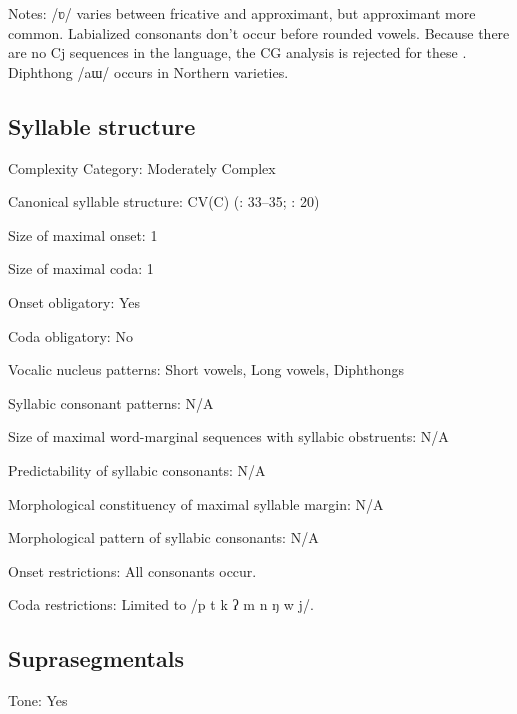 {\begin{appendixdesc}
\item[Notes:] /ʋ/ varies between fricative and approximant, but approximant more common. Labialized consonants don’t occur before rounded vowels. Because there are no Cj sequences in the language, the CG analysis is rejected for these \citep[138]{Erickson2001}. Diphthong /aɯ/ occurs in Northern varieties.
\end{appendixdesc}
\subsection*{Syllable structure}
\begin{appendixdesc}

\item[Complexity Category:] Moderately Complex

\item[Canonical syllable structure:] CV(C) (\citealt{Enfield2007}: 33--35; \citealt{MorevEtAl1979}: 20)

\item[Size of maximal onset:] 1

\item[Size of maximal coda:] 1

\item[Onset obligatory:] Yes

\item[Coda obligatory:] No

\item[Vocalic nucleus patterns:] Short vowels, Long vowels, Diphthongs

\item[Syllabic consonant patterns:] N/A

\item[Size of maximal word-marginal sequences with syllabic obstruents:] N/A

\item[Predictability of syllabic consonants:] N/A

\item[Morphological constituency of maximal syllable margin:] N/A

\item[Morphological pattern of syllabic consonants:] N/A

\item[Onset restrictions:] All consonants occur. 

\item[Coda restrictions:] Limited to /p t k ʔ m n ŋ w j/.
\end{appendixdesc}
\subsection*{Suprasegmentals}
\begin{appendixdesc}
\item[Tone:] Yes


\end{appendixdesc}}
